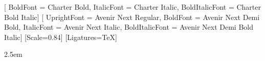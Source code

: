 %

\usepackage[a4paper, left=28mm, right=28mm, top=26mm, bottom=28mm, headsep=9mm, footskip=13mm]{geometry}

\usepackage{fontspec}
\setmainfont{Charter}[
  BoldFont = {Charter Bold}, ItalicFont = {Charter Italic}, BoldItalicFont = {Charter Bold Italic}]
\setsansfont{Avenir Next}[
  UprightFont = {Avenir Next Regular}, BoldFont = {Avenir Next Demi Bold},
  ItalicFont = {Avenir Next Italic}, BoldItalicFont = {Avenir Next Demi Bold Italic}]
\setmonofont{Menlo}[Scale=0.84]
\newfontfamily{}
\newfontfamily{}[Ligatures=TeX]

\usepackage{xcolor}
\color{ink}

\usepackage{pifont}
\newcommand{\tierok}{{\color{good}\ding{51}}}
\newcommand{\tiermid}{{\color{warn}\ding{108}}}
\newcommand{\tierno}{{\color{crit}\ding{55}}}

\linespread{1.10}
\setlength{\parindent}{0pt}
\setlength{\parskip}{5pt plus 1pt minus 1pt}
\emergencystretch 2.5em
\setcounter{secnumdepth}{2}
\setcounter{tocdepth}{1}
 

